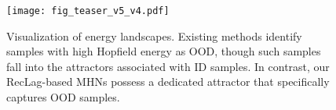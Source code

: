 \begin{figure}
\centering
\vspace{10pt}
\texttt{[image: fig\_teaser\_v5\_v4.pdf]}
\caption{
Visualization of energy landscapes. Existing methods identify samples with high Hopfield energy as OOD, though such samples fall into the attractors associated with ID samples.
In contrast, our RecLag-based MHNs possess a dedicated attractor that specifically captures OOD samples.
}
\label{fig:teaser}
\end{figure}